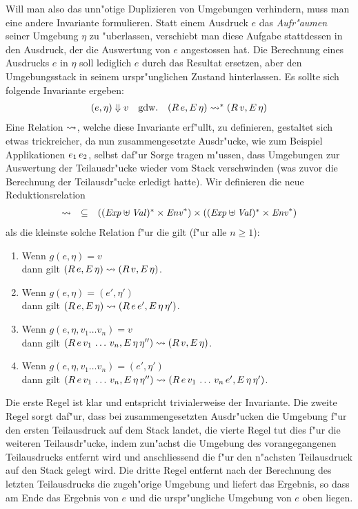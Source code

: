 \documentclass[12pt,a4paper]{article}
\begin{document}
Will man also das unn"otige Duplizieren von Umgebungen verhindern, muss man eine andere Invariante formulieren.
Statt einem Ausdruck $e$ das \emph{Aufr"aumen} seiner Umgebung $\eta$ zu "uberlassen, verschiebt man diese
Aufgabe stattdessen in den Ausdruck, der die Auswertung von $e$ angestossen hat. Die Berechnung eines Ausdrucks
$e$ in $\eta$ soll lediglich $e$ durch das Resultat ersetzen, aber den Umgebungsstack in seinem urspr"unglichen
Zustand hinterlassen. Es sollte sich folgende Invariante ergeben:
\[\begin{array}{rcl}
  (e,\eta) \Downarrow v & \text{gdw.} & (R\,e,E\,\eta) \rightsquigarrow^* (R\,v,E\,\eta)
\end{array}\]
Eine Relation $\rightsquigarrow$, welche diese Invariante erf"ullt, zu definieren, gestaltet sich etwas trickreicher,
da nun zusammengesetzte Ausdr"ucke, wie zum Beispiel Applikationen ${e_1}\,{e_2}$, selbst daf"ur Sorge
tragen m"ussen, dass Umgebungen zur Auswertung der Teilausdr"ucke wieder vom Stack verschwinden (was zuvor
die Berechnung der Teilausdr"ucke erledigt hatte). Wir definieren die neue Reduktionsrelation
\[\begin{array}{rcl}
  \rightsquigarrow & \subseteq & ((\mathit{Exp} \uplus \mathit{Val})^* \times \mathit{Env}^*) \times ((\mathit{Exp} \uplus \mathit{Val})^* \times \mathit{Env}^*)
\end{array}\]
als die kleinste solche Relation f"ur die gilt (f"ur alle $n \ge 1$):
\begin{enumerate}
\item Wenn $g(e,\eta) = v$ \\
  dann gilt $(R\,e,E\,\eta) \rightsquigarrow (R\,v,E\,\eta)$.
\item Wenn $g(e,\eta) = (e',\eta')$ \\
  dann gilt $(R\,e,E\,\eta) \rightsquigarrow (R\,e\,e',E\,\eta\,\eta')$.
\item Wenn $g(e,\eta,v_1 \ldots v_n) = v$ \\
  dann gilt $(R\,e\,v_1\,\ldots\,v_n,E\,\eta\,\eta'') \rightsquigarrow (R\,v,E\,\eta)$.
\item Wenn $g(e,\eta,v_1 \ldots v_n) = (e',\eta')$ \\
  dann gilt $(R\,e\,v_1\,\ldots\,v_n,E\,\eta\,\eta'') \rightsquigarrow (R\,e\,v_1\,\ldots\,v_n\,e',E\,\eta\,\eta')$.
\end{enumerate}
Die erste Regel ist klar und entspricht trivialerweise der Invariante. Die zweite Regel sorgt daf"ur, dass
bei zusammengesetzten Ausdr"ucken die Umgebung f"ur den ersten Teilausdruck auf dem Stack landet, die vierte
Regel tut dies f"ur die weiteren Teilausdr"ucke, indem zun"achst die Umgebung des vorangegangenen Teilausdrucks
entfernt wird und anschliessend die f"ur den n"achsten Teilausdruck auf den Stack gelegt wird. Die dritte
Regel entfernt nach der Berechnung des letzten Teilausdrucks die zugeh"orige Umgebung und liefert das
Ergebnis, so dass am Ende das Ergebnis von $e$ und die urspr"ungliche Umgebung von $e$ oben liegen.
\end{document}
